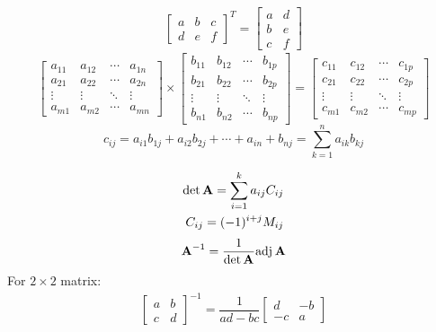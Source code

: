 \scriptsize
\begin{align*}
    \begin{bmatrix}
        a&b&c\\
        d&e&f
    \end{bmatrix}^T
    =\begin{bmatrix}
        a&d\\
        b&e\\
        c&f
    \end{bmatrix}
\end{align*}
\tiny
\[
     \begin{bmatrix}
         a_{11} & a_{12} & \cdots & a_{1n}\\
         a_{21} & a_{22} & \cdots & a_{2n}\\ 
         \vdots & \vdots & \ddots & \vdots\\ 
         a_{m1} & a_{m2} & \cdots & a_{mn} 
     \end{bmatrix}
     \times
     \begin{bmatrix}
         b_{11} & b_{12} & \cdots & b_{1p}\\
         b_{21} & b_{22} & \cdots & b_{2p}\\ 
         \vdots & \vdots & \ddots & \vdots\\ 
         b_{n1} & b_{n2} & \cdots & b_{np} 
     \end{bmatrix}
      =
     \begin{bmatrix}
         c_{11} & c_{12} & \cdots & c_{1p}\\
         c_{21} & c_{22} & \cdots & c_{2p}\\ 
         \vdots & \vdots & \ddots & \vdots\\ 
         c_{m1} & c_{m2} & \cdots & c_{mp} 
     \end{bmatrix}
\]
\scriptsize
\begin{equation*}
     c_{ij}= a_{i1} b_{1j} + a_{i2} b_{2j} +\cdots+ a_{in} + b_{nj} = \sum_{k=1}^n a_{ik}b_{kj} 
\end{equation*}


\begin{align*}
    \det \textbf{A} = \sum_{i=1}^k a_{ij} C_{ij}\\
    C_{ij}=(-1)^{i+j}M_{ij}
\end{align*}
\begin{align*}
    \textbf{A}^{-1}= \frac{1}{\det \textbf{A}}\text{adj}\hspace{2pt} \textbf{A}
\end{align*}
For $2\times 2$ matrix:
\begin{align*}
    \begin{bmatrix}a&b\\c&d\end{bmatrix}^{-1} = \dfrac1{ad-bc}{\begin{bmatrix}d&-b\\-c&a\end{bmatrix}}
\end{align*}


